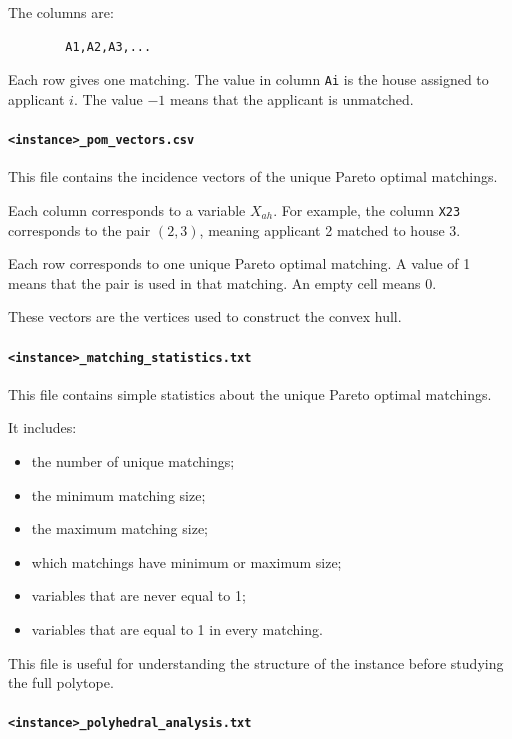 \documentclass[12pt]{report}
\numberwithin{algorithm}{chapter}
\begin{document}
	The columns are:
	
	\begin{verbatim}
		A1,A2,A3,...
	\end{verbatim}
	
	Each row gives one matching. The value in column \texttt{Ai} is the house assigned to applicant \(i\). The value \(-1\) means that the applicant is unmatched.
	
	\paragraph{\texttt{<instance>\_pom\_vectors.csv}}
	
	This file contains the incidence vectors of the unique Pareto optimal matchings.
	
	Each column corresponds to a variable \(X_{ah}\). For example, the column \texttt{X23} corresponds to the pair \((2,3)\), meaning applicant 2 matched to house 3.
	
	Each row corresponds to one unique Pareto optimal matching. A value of 1 means that the pair is used in that matching. An empty cell means 0.
	
	These vectors are the vertices used to construct the convex hull.
	
	\paragraph{\texttt{<instance>\_matching\_statistics.txt}}
	
	This file contains simple statistics about the unique Pareto optimal matchings.
	
	It includes:
	
	\begin{itemize}
		\item the number of unique matchings;
		\item the minimum matching size;
		\item the maximum matching size;
		\item which matchings have minimum or maximum size;
		\item variables that are never equal to 1;
		\item variables that are equal to 1 in every matching.
	\end{itemize}
	
	This file is useful for understanding the structure of the instance before studying the full polytope.
	
	\paragraph{\texttt{<instance>\_polyhedral\_analysis.txt}}
	
\end{document}
